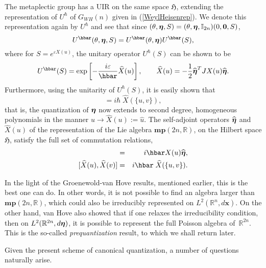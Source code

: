 \documentclass[11pt]{amsart}
\numberwithin{equation}{section}
\theoremstyle{remark}
\newcommand\HH{\mathfrak H}
\newcommand{\be}{\begin{equation}}
\newcommand{\en}{\end{equation}}
\newcommand{\bea}{\begin{eqnarray}}
\newcommand{\ena}{\end{eqnarray}}
\newcommand{\bfeta}{\mbox{\boldmath $\eta$}}
\newcommand{\bx}{\mathbf x}
\newcommand{\bmp}{\mathbf{mp}}
\begin{document}
The metaplectic group has a UIR on the same space $\HH$, extending
the representation of $U^{\hbar}$ of $G_{WH}(n)$ given in
(\ref{WeylHeisenrep}). We denote this representation again by
$U^{\hbar}$ and see that since $(\theta , \bfeta , S) =
(\theta , \bfeta , {\mathbb I}_{2n})(0 , \mathbf 0 , S)$,
\be
   U^{\hbar} (\theta , \bfeta , S) =
      U^{\hbar}(\theta , \bfeta)U^{\hbar}(S),
\label{metaplectrep1}
\en
where for $S = \displaystyle{e^{\varepsilon X(u)}}$, the unitary operator
$U^{\hbar}(S)$ can be shown \cite{bib:-simsudmu1} to be
\be
  U^{\hbar}(S) = \exp\left[-\frac {i\varepsilon}\hbar \widehat{X}(u)
     \right], \qquad \widehat{X}(u) = -\frac 12 \widehat{\bfeta}^{T}
        JX(u)\widehat{\bfeta}.
\label{metaplectrep2}
\en
Furthermore, using the unitarity of $U^{\hbar}(S)$, it is easily shown that
\be
  [\widehat{X}(u), \widehat{X}(v)] = i\hbar\; \widehat{X}(\{u,v\}),
\label{metaplectrep3}
\en
that is, the quantization of $\bfeta$ now extends to second degree,
homogeneous polynomials in the manner $u \rightarrow  \widehat{X}(u) :=
\widehat{u}$. The  self-adjoint operators $\widehat{\bfeta}$ and
$\widehat{X}(u)$ of the representation of the Lie algebra
$\bmp(2n, \mathbb R )$, on the Hilbert space $\HH$, satisfy the full
set of commutation relations,
\bea
 [\widehat{\bfeta}, \widehat{X}(u)] & = & i\hbar X(u)\widehat{\bfeta},
           \nonumber\\[0pt]
  [\widehat{X}(u), \widehat{X}(v)]  &  = & i\hbar\;\widehat{X}(\{u,v\}).
\label{metaplectrep4}
\ena

    In the light of the Groenewold-van Hove results, mentioned earlier,
this is the best one can do. In other words, it is
not possible to find an algebra larger than
$\bmp(2n, \mathbb R )$, which could also be irreducibly
represented on $L^{2}({\mathbb R}^{n}, d\bx )$. On the other hand,
van Hove also showed that if one relaxes the irreducibility condition, then
on $L^{2}({\mathbb R}^{2n}, d\bfeta )$,
it is possible to represent the full Poisson algebra
of~${\mathbb R}^{2n}$. This is the so-called
{\em prequantization} result, to which we shall return later.

Given the present scheme of canonical quantization, a number of questions
naturally arise.
\end{document}
